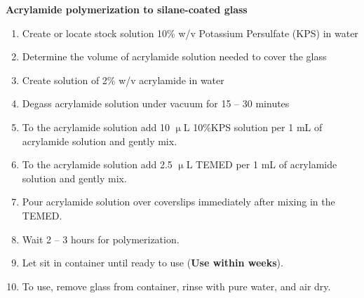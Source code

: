 \begin{appendices}
{\bf Acrylamide polymerization to silane-coated glass}
\begin{enumerate}
  \item Create or locate stock solution 10\% w/v Potassium Persulfate (KPS) in water
  \item Determine the volume of acrylamide solution needed to cover the glass
  \item Create solution of 2\% w/v acrylamide in water
  \item Degass acrylamide solution under vacuum for 15 -- 30 minutes
  \item To the acrylamide solution add 10 $\upmu$L 10\%KPS solution per 1 mL of acrylamide solution and gently mix.
  \item To the acrylamide solution add 2.5 $\upmu$L TEMED per 1 mL of acrylamide solution and gently mix.
  \item Pour acrylamide solution over coverslips immediately after mixing in the TEMED.
  \item Wait 2 -- 3 hours for polymerization.
  \item Let sit in container until ready to use ({\bf Use within weeks}).
  \item To use, remove glass from container, rinse with pure water, and air dry.
\end{enumerate}

\end{appendices}
